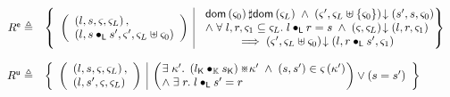 \begin{definition}[Rely]
%
\[
\begin{array}{r l}
	\extendR \eqdef & 
	\left\{
	\begin{array}{l | l}
		\left(
		\begin{array}{l}
			\left(l, s, \amod{}, \amod{L} \right),\\
			\left(l, s \composeL s', \amod{}', \amod{L} \uplus \amod{0} \right)
		\end{array}
		\right)
		&
		\begin{array}{l}
			\dom{\amod{0}} \disjoint \dom{\amod{L}}
			\;\land\;
			\extendsAM{\amod{}', \amod{L} \uplus \{\amod{0}\}}{s'}{s}{\amod{0}}		\\
			
			\land\;\for{l, r, \amod{1} \subseteq \amod{L}} l \composeL r = s \;\land\; \extendsAM{\amod{}, \amod{L}}{l}{r}{\amod{1}}\\
			\hspace*{1cm} \implies \extendsAM{\amod{}', \amod{L} \uplus \amod{0}}{l}{r \composeL s'}{\amod{1}}\\
			

		\end{array}
		\hspace*{-0.15cm}
	\end{array}	
	\hspace*{-0.2cm}
	\right\}\\\\
	
	
	\updateR \eqdef & 
	\left\{
	\begin{array}{l | l}
		\left(
		\begin{array}{l}
			\left(l, s, \amod{}, \amod{L} \right),\\
			\left(l, s', \amod{}, \amod{L}\right)
		\end{array}
		\right)
		&
		\left(
		\hspace*{-0.15cm}
		\begin{array}{l}
			\exsts{\ca{}'} \left( \capPart{l} \composeCap \capPart{s} \right) \separate \ca{}' \;\land\; (s, s') \in \amod{} \left(\ca{}'\right) \\
			\land\; \exsts{r} l \composeL s' = r
		\end{array}
		\hspace*{-0.15cm}
		\right)
		\lor
		(s = s')
	\end{array}	
	\right\}\\\\
	

\end{array}\]
\end{definition}
